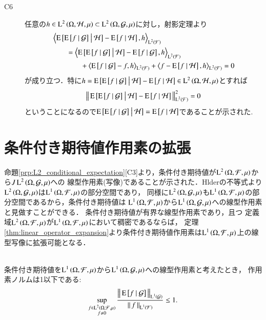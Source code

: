 \begin{prf}
\begin{description}
			\item[C6] 任意の$h \in \operatorname{L}^{2} \left(\Omega, \mathcal{H},\mu\right) \subset \operatorname{L}^{2} \left(\Omega, \mathcal{G},\mu\right)$に対し，射影定理より
				\begin{align}
					&\inprod<\cexp{\cexp{f}{\mathcal{G}}}{\mathcal{H}} - \cexp{f}{\mathcal{H}}, h>_{\Lp{2}{\mathcal{F}}} \\
					&\qquad = \inprod<\cexp{\cexp{f}{\mathcal{G}}}{\mathcal{H}} - \cexp{f}{\mathcal{G}}, h>_{\Lp{2}{\mathcal{F}}} \\
						&\qquad \qquad + \inprod<\cexp{f}{\mathcal{G}} - f, h>_{\Lp{2}{\mathcal{F}}} + \inprod<f - \cexp{f}{\mathcal{H}}, h>_{\Lp{2}{\mathcal{F}}}
					= 0
				\end{align}
				が成り立つ．特に$h = \operatorname{E} \left[ \operatorname{E} \left[ f \ \middle|\ \mathcal{G} \right] \ \middle|\ \mathcal{H} \right] - \operatorname{E} \left[ f \ \middle|\ \mathcal{H} \right] \in \operatorname{L}^{2} \left(\Omega, \mathcal{H},\mu\right)$とすれば
				\begin{align}
					\left\|\, \operatorname{E} \left[ \operatorname{E} \left[ f \ \middle|\ \mathcal{G} \right] \ \middle|\ \mathcal{H} \right] - \operatorname{E} \left[ f \ \middle|\ \mathcal{H} \right]\, \right\|_{\operatorname{L}^{2} \left(\mathcal{F}\right)}^2 = 0
				\end{align}
				ということになるので$\operatorname{E} \left[ \operatorname{E} \left[ f \ \middle|\ \mathcal{G} \right] \ \middle|\ \mathcal{H} \right] = \operatorname{E} \left[ f \ \middle|\ \mathcal{H} \right]$であることが示された.
		\end{description}
		\QED
	\end{prf}
	
\section{条件付き期待値作用素の拡張}
	命題\ref{prp:L2_conditional_expectation}[C3]より，条件付き期待値が$\operatorname{L}^{2} \left(\Omega,\mathcal{F},\mu\right)$から$J\operatorname{L}^{2} \left(\Omega,\mathcal{G},\mu\right)$への
	線型作用素(写像)であることが示された．Hlderの不等式より$\operatorname{L}^{2} \left(\Omega,\mathcal{G},\mu\right)$は$\operatorname{L}^{1} \left(\Omega,\mathcal{F},\mu\right)$の部分空間であり，
	同様に$\operatorname{L}^{2} \left(\Omega,\mathcal{G},\mu\right)$も$\operatorname{L}^{1} \left(\Omega,\mathcal{F},\mu\right)$の部分空間であるから，条件付き期待値は
	$\operatorname{L}^{1} \left(\Omega,\mathcal{F},\mu\right)$から$\operatorname{L}^{1} \left(\Omega,\mathcal{G},\mu\right)$への線型作用素と見做すことができる．
	条件付き期待値が有界な線型作用素であり，且つ
	定義域$\operatorname{L}^{2} \left(\Omega,\mathcal{F},\mu\right)$が$\operatorname{L}^{1} \left(\Omega,\mathcal{F},\mu\right)$において稠密であるならば，
	定理\ref{thm:linear_operator_expansion}より条件付き期待値作用素は$\operatorname{L}^{1} \left(\Omega,\mathcal{F},\mu\right)$上の線型写像に拡張可能となる．
	
	\begin{itembox}[l]{}
		\begin{lem}[条件付き期待値作用素の有界性]\mbox{}\\
			条件付き期待値を$\operatorname{L}^{1} \left(\Omega,\mathcal{F},\mu\right)$から$\operatorname{L}^{1} \left(\Omega,\mathcal{G},\mu\right)$への線型作用素と考えたとき，
			作用素ノルムは1以下である:
			\begin{align}
				\operatorname*{sup}_{\substack{f \in \operatorname{L}^{2} \left(\Omega,\mathcal{F},\mu\right) \\ f \neq 0}} \frac{ \left\|\, \operatorname{E} \left[ f \ \middle|\ \mathcal{G} \right]\, \right\|_{\operatorname{L}^{1} \left(\mathcal{G}\right)} }{ \left\|\, f\, \right\|_{\operatorname{L}^{1} \left(\mathcal{F}\right)} } \leq 1.
			\end{align}
			\label{lem:conditional_exp_bound}
		\end{lem}
	\end{itembox}
	
